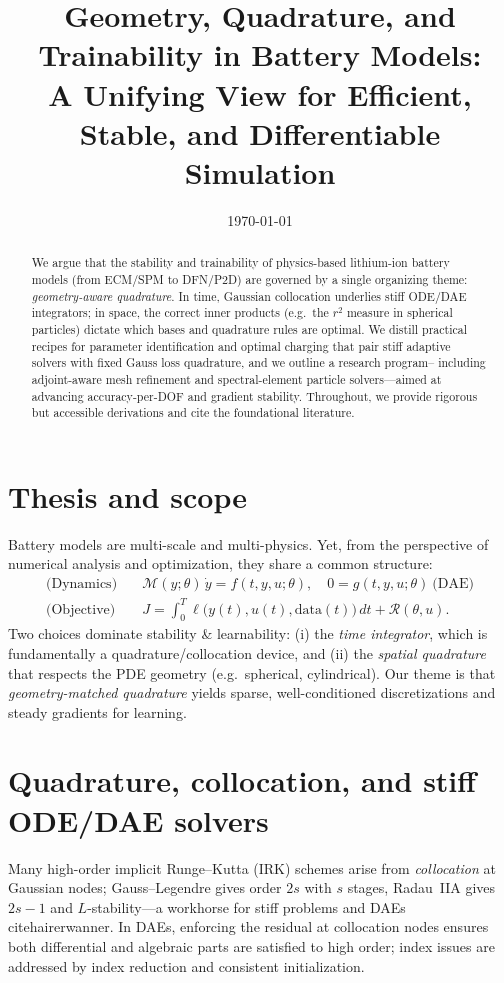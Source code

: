\documentclass[11pt]{article}
\title{\vspace{-1.0em}\Large Geometry, Quadrature, and Trainability in Battery Models:\\
A Unifying View for Efficient, Stable, and Differentiable Simulation}
\author{}
\date{\today}
\begin{document}
\maketitle

\begin{abstract}
We argue that the stability and trainability of physics-based lithium-ion battery models (from ECM/SPM to DFN/P2D) are
governed by a single organizing theme: \emph{geometry-aware quadrature}. In time, Gaussian collocation underlies stiff 
ODE/DAE integrators; in space, the correct inner products (e.g.\ the $r^2$ measure in spherical particles) dictate
which bases and quadrature rules are optimal. We distill practical recipes for parameter identification and optimal
charging that pair stiff adaptive solvers with fixed Gauss loss quadrature, and we outline a research program--
including adjoint-aware mesh refinement and spectral-element particle solvers---aimed at advancing accuracy-per-DOF
and gradient stability. Throughout, we provide rigorous but accessible derivations and cite the foundational literature.
\end{abstract}

\section{Thesis and scope}
Battery models are multi-scale and multi-physics. Yet, from the perspective of numerical analysis and optimization, they share a common structure:
\begin{align}
  \text{(Dynamics)}\quad & \mathcal{M}(y;\theta)\,\dot{y} = f(t,y,u;\theta),\quad 0=g(t,y,u;\theta)\ \text{(DAE)}\label{eq:dae}\\
  \text{(Objective)}\quad & J = \int_0^T \ell\big(y(t),u(t),\text{data}(t)\big)\,dt + \mathcal{R}(\theta,u).\label{eq:objective}
\end{align}
Two choices dominate stability \& learnability:
(i) the \emph{time integrator}, which is fundamentally a quadrature/collocation device, and
(ii) the \emph{spatial quadrature} that respects the PDE geometry (e.g.\ spherical, cylindrical).
Our theme is that \emph{geometry-matched quadrature} yields sparse, well-conditioned discretizations and steady gradients for learning.

\section{Quadrature, collocation, and stiff ODE/DAE solvers}
Many high-order implicit Runge--Kutta (IRK) schemes arise from \emph{collocation} at Gaussian nodes; Gauss--Legendre
gives order $2s$ with $s$ stages, Radau~IIA gives $2s-1$ and $L$-stability---a workhorse for stiff problems and DAEs 
cite{hairerwanner}. In DAEs, enforcing the residual at collocation nodes ensures both differential and algebraic parts
are satisfied to high order; index issues are addressed by index reduction and consistent initialization.
\end{document}
